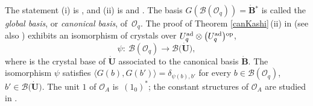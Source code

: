 \documentclass[10pt,a4paper]{amsart}
\numberwithin{equation}{section}
\theoremstyle{definition}
\newcommand{\Ll}{{\mathcal L}}
\newcommand{\Oo}{{\mathcal O}}
\newcommand{\ra}{\rightarrow}
\begin{document}
The statement (i) is \cite[Theorem~1]{Kashiwara2}, and (ii) is \cite[Theorem 10.1 and Proposition 10.2.2]{Kashiwara3} and \cite[Section~29.5]{Lusztig}. The basis $G(\mathcal{B}(\Oo_q))=\dot{\mathbf{B}} {}^*$ is called the {\it global basis}, or {\it canonical basis}, of~$\Oo_q$. The proof of Theorem \ref{canKashi}\,(ii) in \cite{Kashiwara3} (see also \cite{Kashiwara4}) exhibits an isomorphism of crystals over $U_q^{\rm ad} \otimes \big(U_q^{\rm ad}\big){}^{\rm op}$,
\begin{equation}\label{isocrystal}
\psi\colon\ \mathcal{B}(\Oo_q) \ra \mathcal{B}\bigl(\dot{\mathbf{U}}\bigr),
\end{equation}
where \smash{$\big(\Ll\bigl(\dot{\mathbf{U}}\bigr),\mathcal{B}\bigl(\dot{\mathbf{U}}\bigr)\big)$} is the crystal base of $\dot{\mathbf{U}}$ associated to the canonical basis $\dot{\mathbf{B}}$. The isomorphism $\psi$ satisfies $\langle G(b),G(b')\rangle =\delta_{\psi(b),b'}$ for every $b\in \mathcal{B}(\Oo_q)$, $b'\in \mathcal{B}\bigl(\dot{\mathbf{U}}\bigr)$. The unit $1$ of $\Oo_A$ is~$(1_0)^*$; the constant structures of $\Oo_A$ are studied in \cite{Lusztig,Lusztig3}.
\end{document}

